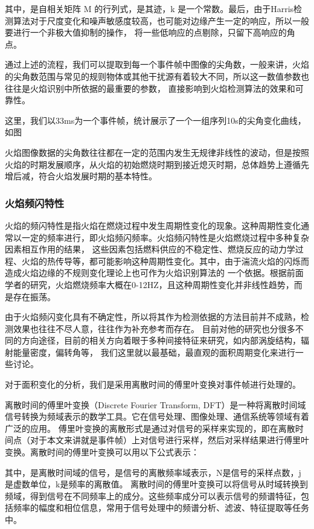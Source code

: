 其中，是自相关矩阵 M 的行列式，是其迹，k 是一个常数。最后，由于Harris检测算法对于尺度变化和噪声敏感度较高，也可能对边缘产生一定的响应，所以一般要进行一个非极大值抑制的操作，
将一些低响应的点剔除，只留下高响应的角点。

通过上述的流程，我们可以提取到每一个事件帧中图像的尖角数，一般来讲，火焰的尖角数范围与常见的规则物体或其他干扰源有着较大不同，所以这一数值参数也往往是火焰识别中所依据的最重要的参数，
直接影响到火焰检测算法的效果和可靠性。

这里，我们以33ms为一个事件帧，统计展示了一个一组序列10s的尖角变化曲线，如图

火焰图像数据的尖角数往往都在一定的范围内发生无规律非线性的波动，但是按照火焰的时期发展顺序，从火焰的初始燃烧时期到接近熄灭时期，总体趋势上遵循先增后减，符合火焰发展时期的基本特性。

\subsubsection{火焰频闪特性}
火焰的频闪特性是指火焰在燃烧过程中发生周期性变化的现象。这种周期性变化通常以一定的频率进行，即火焰频闪频率。火焰频闪特性是火焰燃烧过程中多种复杂因素相互作用的结果，
这些因素包括燃料供应的不稳定性、燃烧反应的动力学过程、火焰的热传导等，都可能影响这种周期性变化。其中，由于湍流火焰的闪烁而造成火焰边缘的不规则变化理论上也可作为火焰识别算法的
一个依据。根据前面学者的研究，火焰燃烧频率大概在0-12HZ，且这种周期性变化并非线性趋势，而是存在振荡。

由于火焰频闪变化具有不确定性，所以将其作为检测依据的方法目前并不成熟，检测效果也往往不尽人意，往往作为补充参考而存在。
目前对他的研究也分很多不同的方向途径，目前的相关方向着眼于多种间接特征来研究，如内部涡旋结构，辐射能量密度，偏转角等，
我们这里就以最基础，最直观的面积周期变化来进行一些讨论。

对于面积变化的分析，我们是采用离散时间的傅里叶变换对事件帧进行处理的。

离散时间的傅里叶变换（Discrete Fourier Transform, DFT）是一种将离散时间域信号转换为频域表示的数学工具。它在信号处理、图像处理、通信系统等领域有着广泛的应用。
傅里叶变换的离散形式是通过对信号的采样来实现的，即在离散时间点（对于本文来讲就是事件帧）上对信号进行采样，然后对采样结果进行傅里叶变换。离散时间的傅里叶变换可以用以下公式表示：

其中，是离散时间域的信号，是信号的离散频率域表示，N是信号的采样点数，j是虚数单位，k是频率的离散值。
离散时间的傅里叶变换可以将信号从时域转换到频域，得到信号在不同频率上的成分。这些频率成分可以表示信号的频谱特征，包括频率的幅度和相位信息，常用于信号处理中的频谱分析、滤波、特征提取等任务中。

